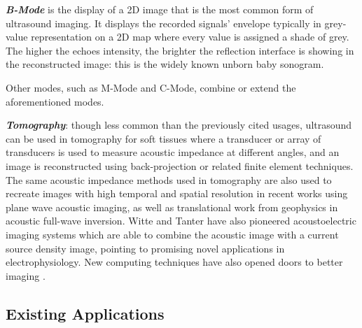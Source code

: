 \documentclass{article}
\begin{document}
\textbf{\textit{B-Mode}} is the display of a 2D image that is the most common form of ultrasound imaging. It displays the recorded signals' envelope typically in grey-value representation on a 2D map where every value is assigned a shade of grey. The higher the echoes intensity, the brighter the reflection interface is showing in the reconstructed image: this is the widely known unborn baby sonogram.

Other modes, such as M-Mode and C-Mode, combine or extend the aforementioned modes.

\textbf{\textit{Tomography}}: though less common than the previously cited usages, ultrasound can be used in tomography for soft tissues \cite{zhang_design_2015,duric_detection_2007,wen_design_2019,ashfaq_new_2004} where a transducer or array of transducers is used to measure acoustic impedance at different angles, and an image is reconstructed using back-projection or related finite element techniques. The same acoustic impedance methods used in tomography are also used to recreate images with high temporal and spatial resolution in recent works using plane wave acoustic imaging\cite{Rabut2019}, as well as translational work from geophysics in acoustic full-wave inversion\cite{Warner2013}. Witte and Tanter have also pioneered acoustoelectric imaging systems which are able to combine the acoustic image with a current source density image, pointing to promising novel applications in electrophysiology\cite{Xi2009,Qin2017}. New computing techniques have also opened doors to better imaging \cite{guasch_full-waveform_2020,rymarczyk_logistic_2019}. 


\subsection{Existing Applications}
\end{document}
